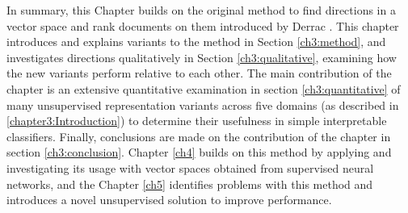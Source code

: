  In summary, this Chapter builds on the original method to find directions in a vector space and rank documents on them introduced by Derrac \cite {Derrac2015}. This chapter  introduces and explains variants to the method in Section \ref{ch3:method}, and investigates directions qualitatively in Section \ref{ch3:qualitative}, examining how the new variants perform relative to each other. The main contribution of the chapter is an extensive quantitative examination in section \ref{ch3:quantitative} of many unsupervised representation variants across five domains (as described in \ref{chapter3:Introduction}) to determine their usefulness in simple interpretable classifiers.  Finally, conclusions are made on the contribution of the chapter in section \ref{ch3:conclusion}. Chapter \ref{ch4} builds on this method by applying and investigating its usage with vector spaces obtained from supervised neural networks, and the Chapter \ref{ch5} identifies problems with this method and introduces a novel unsupervised solution to improve performance.
 








